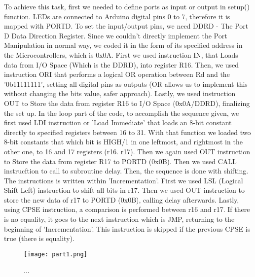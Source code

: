 \documentclass[pdftex,12pt,a4paper]{article}
\begin{document}
To achieve this task, first we needed to define ports as input or output in setup() function. LEDs are connected to Arduino digital pins 0 to 7, therefore it is mapped with PORTD. To set the input/output pins, we need DDRD - The Port D Data Direction Register. Since we couldn't directly implement the Port Manipulation in normal way, we coded it in the form of its specified address in the Microcontrollers, which is 0x0A. First we used instruction IN, that Loads data from I/O Space (Which is the DDRD), into register R16. Then, we used instruction ORI that performs a logical OR operation between Rd and the '0b11111111', setting all digital pins as outputs (OR allows us to implement this without changing the bits value, safer approach). Lastly, we used instruction OUT to Store the data from register R16 to I/O Space (0x0A/DDRD), finalizing the set up.
In the loop part of the code, to accomplish the sequence given, we first used LDI instruction or 'Load Immediate' that loads an 8-bit constant directly to specified registers between 16 to 31. With that function we loaded two 8-bit constants that which bit is HIGH/1 in one leftmost, and rightmost in the other one, to 16 and 17 registers (r16. r17). Then we again used OUT instruction to Store the data from register R17 to PORTD (0x0B). Then we used CALL instrucftion to call to subroutine delay. Then, the sequence is done with shifting. The instructions is written within 'Incrementation'. First we used LSL (Logical Shift Left) instruction to shift all bits in r17. Then we used OUT instruction to store the new data of r17 to PORTD (0x0B), calling delay afterwards. Lastly, using CPSE instruction, a comparison is performed between r16 and r17. If there is no equality, it goes to the next instruction which is JMP, returning to the beginning of 'Incrementation'. This instruction is skipped if the previous CPSE is true (there is equality). 

\begin{figure}[H]   
	\centering     
	\texttt{[image: part1.png]}	
	\caption{...}
	\label{fig1}
\end{figure}

  
\end{document}

